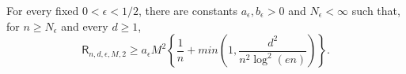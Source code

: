 For every fixed \(0<\epsilon<1/2\), there are constants \(a_{\epsilon},b_{\epsilon}>0\) and \(N_{\epsilon}<\infty\) such that, for \(n\ge N_{\epsilon}\) and every \(d\ge1\),
\[
 \mathsf R_{n,d,\epsilon,M,2}
 \ge a_{\epsilon}M^2\left\{\frac1n+min\left(1,\frac{d^2}{n^2\log^2(en)}\right)\right\}.
\]